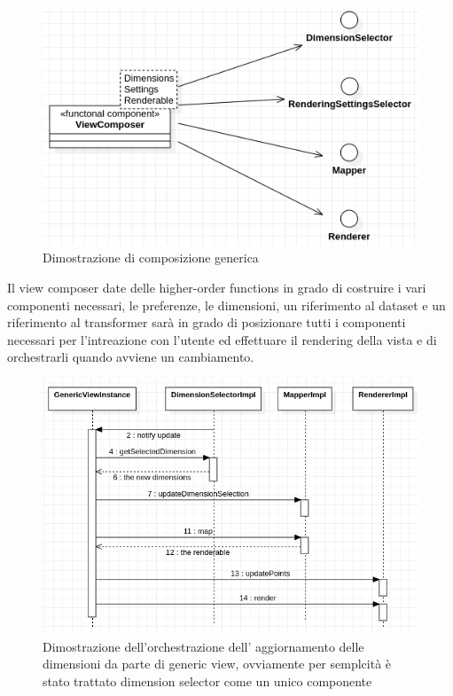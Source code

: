 \begin{figure}[h!]
  \centering
  \includegraphics[scale=0.55]{../../assets/classi_uml/comdelcomposer.png}
  \caption{Dimostrazione di composizione generica}
\end{figure}

Il view composer date delle higher-order functions in grado di costruire i vari
componenti necessari, le preferenze, le dimensioni, un riferimento al dataset e
un riferimento al transformer sarà in grado di posizionare tutti i componenti
necessari per l'intreazione con l'utente ed effettuare il rendering della vista
e di orchestrarli quando avviene un cambiamento.
  
\begin{figure}[h!]
  \centering
  \includegraphics[scale=0.55]{../../assets/classi_uml/interazione_gw.png}
  \caption{Dimostrazione dell'orchestrazione dell' aggiornamento delle
    dimensioni da parte di generic view, ovviamente per semplcità è stato
    trattato dimension selector come un unico componente}
\end{figure}

